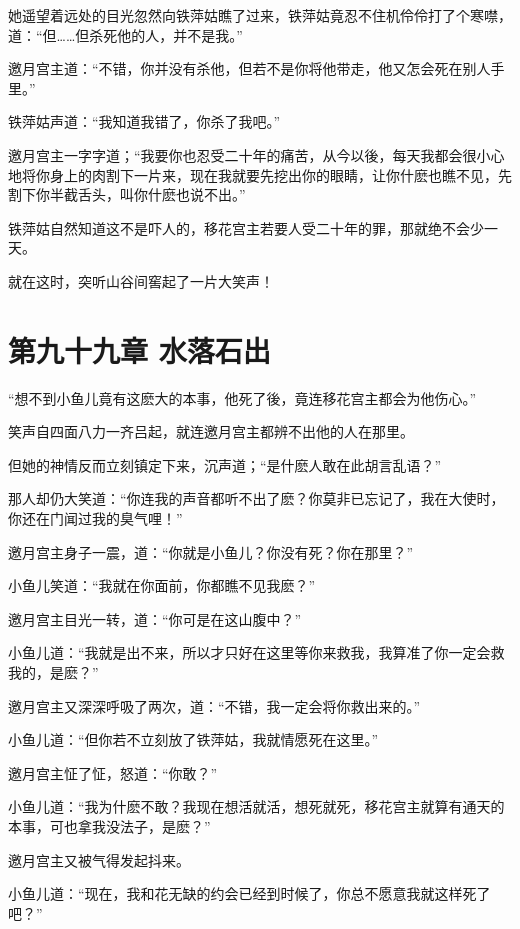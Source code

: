 \documentclass[12pt,oneside]{book}
\begin{document}
她遥望着远处的目光忽然向铁萍姑瞧了过来，铁萍姑竟忍不住机伶伶打了个寒噤，道：``但\ldots\ldots 但杀死他的人，并不是我。''

邀月宫主道：``不错，你并没有杀他，但若不是你将他带走，他又怎会死在别人手里。''

铁萍姑声道：``我知道我错了，你杀了我吧。''

邀月宫主一字字道；``我要你也忍受二十年的痛苦，从今以後，每天我都会很小心地将你身上的肉割下一片来，现在我就要先挖出你的眼睛，让你什麽也瞧不见，先割下你半截舌头，叫你什麽也说不出。''

铁萍姑自然知道这不是吓人的，移花宫主若要人受二十年的罪，那就绝不会少一天。

就在这时，突听山谷间窖起了一片大笑声！

\hypertarget{ux7b2cux4e5dux5341ux4e5dux7ae0-ux6c34ux843dux77f3ux51fa}{%
\chapter{第九十九章
水落石出}\label{ux7b2cux4e5dux5341ux4e5dux7ae0-ux6c34ux843dux77f3ux51fa}}

``想不到小鱼儿竟有这麽大的本事，他死了後，竟连移花宫主都会为他伤心。''

笑声自四面八力一齐吕起，就连邀月宫主都辨不出他的人在那里。

但她的神情反而立刻镇定下来，沉声道；``是什麽人敢在此胡言乱语？''

那人却仍大笑道：``你连我的声音都听不出了麽？你莫非已忘记了，我在大使时，你还在门闻过我的臭气哩！''

邀月宫主身子一震，道：``你就是小鱼儿？你没有死？你在那里？''

小鱼儿笑道：``我就在你面前，你都瞧不见我麽？''

邀月宫主目光一转，道：``你可是在这山腹中？''

小鱼儿道：``我就是出不来，所以才只好在这里等你来救我，我算准了你一定会救我的，是麽？''

邀月宫主又深深呼吸了两次，道：``不错，我一定会将你救出来的。''

小鱼儿道：``但你若不立刻放了铁萍姑，我就情愿死在这里。''

邀月宫主怔了怔，怒道：``你敢？''

小鱼儿道：``我为什麽不敢？我现在想活就活，想死就死，移花宫主就算有通天的本事，可也拿我没法子，是麽？''

邀月宫主又被气得发起抖来。

小鱼儿道：``现在，我和花无缺的约会已经到时候了，你总不愿意我就这样死了吧？''
\end{document}
